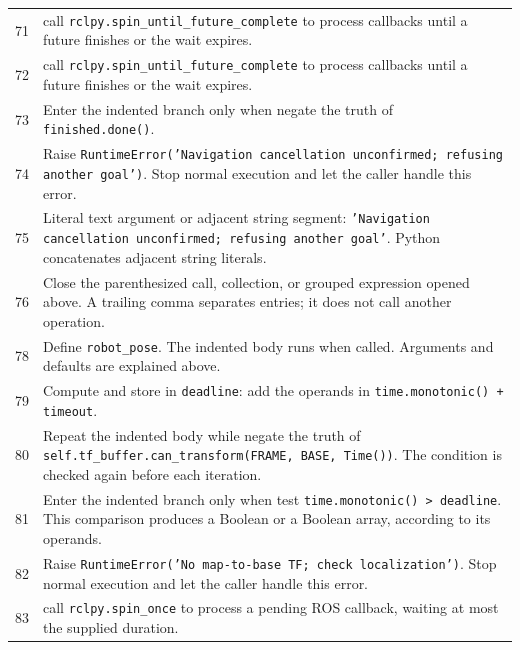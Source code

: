 \documentclass[11pt,a4paper]{book}
\begin{document}
\begin{longtable}{r p{}}
71 & call \texttt{rclpy.spin\_until\_future\_complete} to process callbacks until a future finishes or the wait expires. \\

72 & call \texttt{rclpy.spin\_until\_future\_complete} to process callbacks until a future finishes or the wait expires. \\

73 & Enter the indented branch only when negate the truth of \texttt{finished.done()}. \\

74 & Raise \texttt{RuntimeError('Navigation cancellation unconfirmed; refusing another goal')}. Stop normal execution and let the caller handle this error. \\

75 & Literal text argument or adjacent string segment: \texttt{'Navigation cancellation unconfirmed; refusing another goal'}. Python concatenates adjacent string literals. \\

76 & Close the parenthesized call, collection, or grouped expression opened above. A trailing comma separates entries; it does not call another operation. \\

78 & Define \texttt{robot\_pose}. The indented body runs when called. Arguments and defaults are explained above. \\

79 & Compute and store in \texttt{deadline}: add the operands in \texttt{time.monotonic() + timeout}.  \\

80 & Repeat the indented body while negate the truth of \texttt{self.tf\_buffer.can\_transform(FRAME, BASE, Time())}. The condition is checked again before each iteration. \\

81 & Enter the indented branch only when test \texttt{time.monotonic() > deadline}. This comparison produces a Boolean or a Boolean array, according to its operands. \\

82 & Raise \texttt{RuntimeError('No map-to-base TF; check localization')}. Stop normal execution and let the caller handle this error. \\

83 & call \texttt{rclpy.spin\_once} to process a pending ROS callback, waiting at most the supplied duration. \\


\end{longtable}
\end{document}
